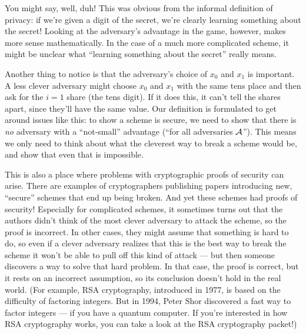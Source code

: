 You might say, well, duh! This was obvious from the informal definition 
of privacy: if we're given a digit of the secret, we're clearly learning 
something about the secret! Looking at the adversary's advantage in the 
game, however, makes more sense mathematically. In the case of a much 
more complicated scheme, it might be unclear what ``learning something 
about the secret'' really means.

Another thing to notice is that the adversary's choice of $x_0$ and $x_1$
is important. A less clever adversary might choose $x_0$ and $x_1$ with 
the same tens place and then ask for the $i=1$ share (the tens digit).
If it does this, it can't tell the shares apart, since they'll have the same
value. Our definition is formulated to get around issues like this: to 
show a scheme is secure, we need to show that there is \emph{no} adversary 
with a ``not-small'' advantage (``for all adversaries $\mathcal{A}$''). This means we only need to think about what the 
cleverest way to break a scheme would be, and show that even that is 
impossible.

This is also a place where problems with cryptographic proofs of security 
can arise. There are examples of cryptographers publishing papers 
introducing new, ``secure'' schemes that end up being broken. And yet 
these schemes had proofs of security! Especially for complicated schemes, 
it sometimes turns out that the authors didn't think of the most clever 
adversary to attack the scheme, so the proof is incorrect. In other cases, they might assume that 
something is hard to do, so even if a clever adversary realizes that this 
is the best way to break the scheme it won't be able to pull off this 
kind of attack --- but then someone discovers a way to solve that 
hard problem. In that case, the proof is correct, but it rests on an 
incorrect assumption, so its conclusion doesn't hold in the real world.
(For example, RSA cryptography, introduced in 1977\cite{rsa},
is based on the difficulty of factoring integers. But in 1994, Peter Shor 
discovered a fast way to factor integers\cite{shor} --- if you have a 
quantum computer. If you're interested in how RSA cryptography works, 
you can take a look at the RSA cryptography packet!)

